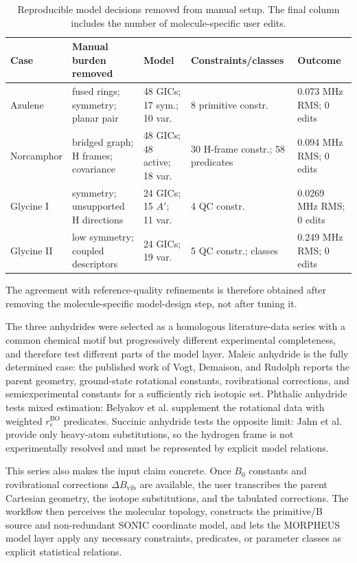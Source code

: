 \documentclass[aip,jcp,reprint,longbibliography,floatfix]{revtex4-2}
\begin{document}
\begin{table}
\caption{Reproducible model decisions removed from manual setup. The final
column includes the number of molecule-specific user edits.}
\label{tab:manual-vs-morpheus}
\scriptsize
\setlength{\tabcolsep}{1.5pt}
\begin{tabular*}{\textwidth}{@{\extracolsep{\fill}}lllll@{}}
\toprule
Case & Manual burden removed & Model & Constraints/classes & Outcome \\
\midrule
Azulene &
fused rings; symmetry; planar pair &
48 GICs; 17 sym.; 10 var. &
8 primitive constr. &
0.073 MHz RMS; 0 edits \\
Norcamphor &
bridged graph; H frames; covariance &
48 GICs; 48 active; 18 var. &
30 H-frame constr.; 58 predicates &
0.094 MHz RMS; 0 edits \\
Glycine I &
symmetry; unsupported H directions &
24 GICs; 15 $A'$; 11 var. &
4 QC constr. &
0.0269 MHz RMS; 0 edits \\
Glycine II &
low symmetry; coupled descriptors &
24 GICs; 19 var. &
5 QC constr.; classes &
0.249 MHz RMS; 0 edits \\
\bottomrule
\end{tabular*}
\end{table}

The agreement with reference-quality refinements is therefore obtained after
removing the molecule-specific model-design step, not after tuning it.

The three anhydrides were selected as a homologous literature-data series
with a common chemical motif but progressively
different experimental completeness, and therefore test different parts of
the model layer. Maleic anhydride is the fully determined case: the published
work of Vogt, Demaison, and Rudolph\cite{Vogt2011MaleicAnhydride} reports the
parent geometry, ground-state rotational constants, rovibrational corrections,
and semiexperimental constants for a sufficiently rich isotopic set. Phthalic
anhydride tests mixed estimation: Belyakov et
al.\cite{Belyakov2022PhthalicAnhydride} supplement the rotational data with
weighted $r_e^\mathrm{BO}$ predicates. Succinic anhydride tests the opposite
limit: Jahn et al.\cite{Jahn2020SuccinicAnhydride} provide only heavy-atom
substitutions, so the hydrogen frame is not experimentally resolved and must be
represented by explicit model relations.

This series also makes the input claim concrete. Once $B_0$ constants and
rovibrational corrections $\Delta B_\mathrm{vib}$ are available, the
user transcribes the parent Cartesian geometry, the isotope
substitutions, and the tabulated corrections. The workflow then perceives the
molecular topology, constructs the primitive/B source and non-redundant SONIC
coordinate model, and lets the MORPHEUS model layer apply any necessary
constraints, predicates, or parameter classes as explicit statistical
relations.
\end{document}

